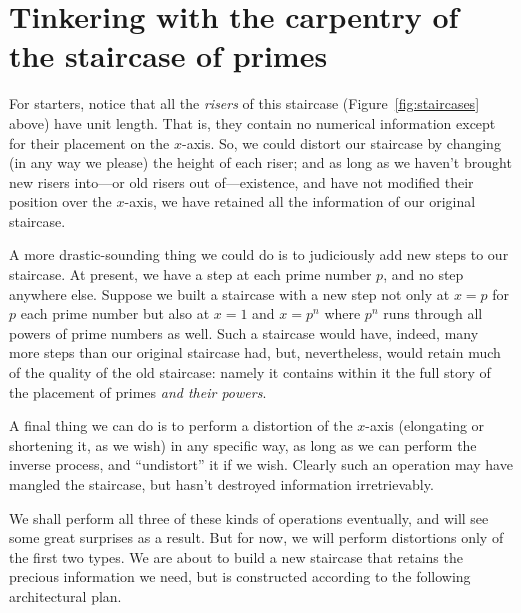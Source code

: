 \documentclass[openany]{book}
\theoremstyle{plain}
\theoremstyle{definition}
\begin{document}
\chapter[Tinkering with the staircase of primes]{Tinkering with the carpentry of the staircase of primes\label{sec:tinkering}}


For starters, notice that all the {\em risers} of this staircase (Figure~\ref{fig:staircases} above) have
unit length. That is, they contain no numerical information except for
their placement on the $x$-axis. So, we could distort our staircase by
changing (in any way we please) the height of each riser; and as long
as we haven't brought new risers into---or old risers out
of---existence, and have not modified their position over the
$x$-axis, we have retained all the information of our original
staircase.


A more drastic-sounding thing we could do is to judiciously add new
steps to our staircase. At present, we have a step at each prime
number $p$, and no step anywhere else. Suppose we built a staircase
with a new step not only at $x=p$ for $p$ each prime number but also at
$x =1$ and $x=p^n$ where $p^n$ runs through all powers of prime numbers as
well. Such a staircase would have, indeed, many more steps than our
original staircase had, but, nevertheless, would retain much of the
quality of the old staircase: namely it contains within it the full
story of the placement of primes {\em and their powers}.

A final thing we can do is to perform a distortion of the $x$-axis
(elongating or shortening it, as we wish) in any specific way, as long
as we can perform the inverse process, and ``undistort'' it if we wish.
Clearly such an operation may have mangled the staircase, but hasn't destroyed
information irretrievably.

We shall perform all three of these kinds of operations eventually,
and will see some great surprises as a result.  But for now, we will
perform distortions only of the first two types.  We are about to
build a new staircase that retains the precious information we need,
but is constructed according to the following architectural plan.
\end{document}
